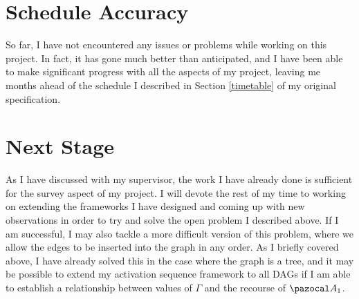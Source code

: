 \documentclass{article}
\begin{document}
\section{Schedule Accuracy}

So far, I have not encountered any issues or problems while working on this project. In fact, it has gone much better than anticipated, and I have been able to make significant progress with all the aspects of my project, leaving me months ahead of the schedule I described in Section \ref{timetable} of my original specification. 

\section{Next Stage}

As I have discussed with my supervisor, the work I have already done is sufficient for the survey aspect of my project. I will devote the rest of my time to working on extending the frameworks I have designed and coming up with new observations in order to try and solve the open problem I described above. If I am successful, I may also tackle a more difficult version of this problem, where we allow the edges to be inserted into the graph in any order. As I briefly covered above, I have already solved this in the case where the graph is a tree, and it may be possible to extend my activation sequence framework to all DAGs if I am able to establish a relationship between values of $\Gamma$ and the recourse of $\pazocal A_1$. 



    
    
\end{document}
